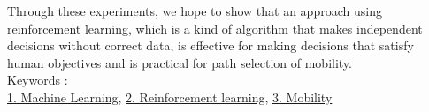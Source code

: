 Through these experiments, we hope to show that an approach using reinforcement learning, which is a kind of algorithm that makes independent decisions without correct data, is effective for making decisions that satisfy human objectives and is practical for path selection of mobility.
~ \\
Keywords : \\
\underline{1. Machine Learning},
\underline{2. Reinforcement learning},
\underline{3. Mobility}
\begin{flushright}
\edept \\
\eauthor
\end{flushright}
